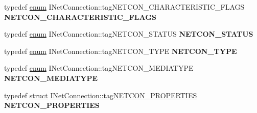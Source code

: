 \begin{DoxyCompactItemize}
typedef \hyperlink{interfaceenum}{enum} I\+Net\+Connection\+::tag\+N\+E\+T\+C\+O\+N\+\_\+\+C\+H\+A\+R\+A\+C\+T\+E\+R\+I\+S\+T\+I\+C\+\_\+\+F\+L\+A\+GS {\bfseries N\+E\+T\+C\+O\+N\+\_\+\+C\+H\+A\+R\+A\+C\+T\+E\+R\+I\+S\+T\+I\+C\+\_\+\+F\+L\+A\+GS}
\item 
\mbox{\label{interface_i_net_connection_a0d28ba8038e00cef52999b3b8688fd54}} 
typedef \hyperlink{interfaceenum}{enum} I\+Net\+Connection\+::tag\+N\+E\+T\+C\+O\+N\+\_\+\+S\+T\+A\+T\+US {\bfseries N\+E\+T\+C\+O\+N\+\_\+\+S\+T\+A\+T\+US}
\item 
\mbox{\label{interface_i_net_connection_a4954a85a2065b50cbcebc5c6123eafb3}} 
typedef \hyperlink{interfaceenum}{enum} I\+Net\+Connection\+::tag\+N\+E\+T\+C\+O\+N\+\_\+\+T\+Y\+PE {\bfseries N\+E\+T\+C\+O\+N\+\_\+\+T\+Y\+PE}
\item 
\mbox{\label{interface_i_net_connection_ac01962f7a1e7ff75a347ae26580f6228}} 
typedef \hyperlink{interfaceenum}{enum} I\+Net\+Connection\+::tag\+N\+E\+T\+C\+O\+N\+\_\+\+M\+E\+D\+I\+A\+T\+Y\+PE {\bfseries N\+E\+T\+C\+O\+N\+\_\+\+M\+E\+D\+I\+A\+T\+Y\+PE}
\item 
\mbox{\label{interface_i_net_connection_a6138562bca8efb24214a02f56d2a937d}} 
typedef \hyperlink{interfacestruct}{struct} \hyperlink{struct_i_net_connection_1_1tag_n_e_t_c_o_n___p_r_o_p_e_r_t_i_e_s}{I\+Net\+Connection\+::tag\+N\+E\+T\+C\+O\+N\+\_\+\+P\+R\+O\+P\+E\+R\+T\+I\+ES} {\bfseries N\+E\+T\+C\+O\+N\+\_\+\+P\+R\+O\+P\+E\+R\+T\+I\+ES}
\end{DoxyCompactItemize}

